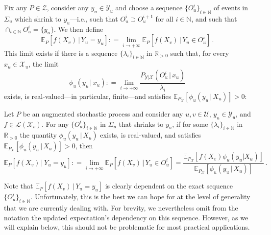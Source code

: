 \documentclass[twoside,11pt]{article}
\newcommand{\nats}{\mathbb{N}}
\newcommand{\reals}{\mathbb{R}}
\newcommand{\realspos}{\reals_{>0}}
\newcommand{\states}{\mathcal{X}}
\newcommand{\observs}{\mathcal{Y}}
\newcommand{\gambles}{\mathcal{L}}
\newcommand{\coloneqq}{:\!=}
\begin{document}
Fix any $P\in\mathcal{Z}$, consider any $y_u\in\observs_u$ and choose a sequence $\{O_u^i\}_{i\in\nats}$ of events in $\Sigma_u$ which shrink to $y_u$---i.e., such that $O_u^i\supset O_u^{i+1}$ for all $i\in\nats$, and such that $\cap_{i\in\nats} O_u^i=\{y_u\}$. We then define
\begin{equation}\label{eq:def:precise_updated_limit}
\mathbb{E}_P[f(X_v)\,\vert\,Y_u=y_u] \coloneqq \lim_{i\to+\infty} \mathbb{E}_P[f(X_v)\,\vert\,Y_u\in O_u^i]\,.
\end{equation}
This limit exists if there is a sequence $\{\lambda_i\}_{i\in\nats}$ in $\realspos$ such that, for every $x_u\in\states_u$, the limit
\begin{equation*}
\phi_u(y_u\,\vert\, x_u) \coloneqq \lim_{i\to+\infty}\frac{P_{\observs\vert\states}(O_u^i\,\vert\, x_u)}{\lambda_i}
\end{equation*}
exists, is real-valued---in particular, finite---and satisfies $\mathbb{E}_{P_\states}[\phi_u(y_u\,\vert\,X_u)]>0$:
\begin{proposition}\label{prop:precise_bayes_rule_densities}
Let $P$ be an augmented stochastic process and consider any $u,v\in\mathcal{U}$, $y_u\in\observs_u$, and $f\in\gambles(\states_v)$. For any $\{O_u^i\}_{i\in\nats}$ in $\Sigma_u$ that shrinks to $y_u$, if for some $\{\lambda_i\}_{i\in\nats}$ in $\realspos$ the quantity $\phi_u(y_u\,\vert\,X_u)$ exists, is real-valued, and satisfies $\mathbb{E}_{P_\states}[\phi_u(y_u\,\vert\,X_u)]>0$, then
\begin{equation}\label{eq:updated_expectation_is_limit}
\mathbb{E}_P[f(X_v)\,\vert\,Y_u=y_u] \coloneqq \lim_{i\to+\infty} \mathbb{E}_P[f(X_v)\,\vert\,Y_u\in O_u^i] = \frac{\mathbb{E}_{P_\states}[f(X_v)\phi_u(y_u\vert X_u)]}{\mathbb{E}_{P_\states}[\phi_u(y_u\,\vert\,X_u)]}\,.
\end{equation}
\end{proposition}
Note that $\mathbb{E}_P[f(X_v)\,\vert\,Y_u=y_u]$ is clearly dependent on the exact sequence $\{O_u^i\}_{i\in\nats}$. Unfortunately, this is the best we can hope for at the level of generality that we are currently dealing with. %
For brevity, we nevertheless omit from the notation the updated expectation's dependency on this sequence. However, as we will explain below, this should not be problematic for most practical applications.
\end{document}
